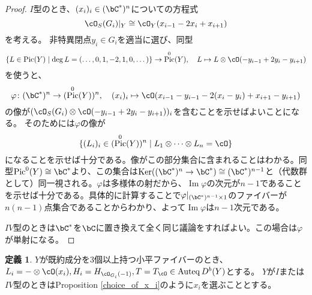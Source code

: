\documentclass[uplatex, a4paper, dvipdfmx]{jsarticle}
\theoremstyle{definition}
\newtheorem{definition}[theorem]{定義}
\DeclareMathOperator{\Auteq}{\mathrm{Auteq}}
\DeclareMathOperator{\Pic}{\mathrm{Pic}}
\DeclareMathOperator{\Ker}{\mathrm{Ker}}
\DeclareMathOperator{\Image}{\mathrm{Im}}
\begin{document}
\begin{proof}
    $I$型のとき、$(x_i)_i \in (\bC^*)^n$についての方程式
    \begin{equation}
        \cO_S(G_i)\vert_Y \cong \cO_Y(x_{i-1} - 2x_i + x_{i+1})
    \end{equation}
    を考える。
    非特異閉点$y_i \in G_i$を適当に選び、同型
    \begin{equation}
        \{L \in \Pic(Y) \mid \deg L = (\dots, 0, 1, -2, 1, 0, \dots)\} \to \Pic^0(Y), \quad L \mapsto L \otimes \cO(-y_{i-1}+2y_i-y_{i+1})
    \end{equation}
    を使うと、
    \begin{equation}
        \varphi \colon (\bC^*)^n \to (\Pic^0(Y))^n, \quad (x_i)_i \mapsto \cO(x_{i-1}-y_{i-1} - 2(x_i-y_i)+x_{i+1}-y_{i+1})
    \end{equation}
    の像が$(\cO_S(G_i) \otimes \cO(-y_{i-1}+2y_i-y_{i+1}))_i$を含むことを示せばよいことになる。
    そのためには$\varphi$の像が
    \begin{equation}
        \{(L_i)_i \in (\Pic^0(Y))^n \mid L_1 \otimes \cdots \otimes L_n = \cO\}
    \end{equation}
    になることを示せば十分である。像がこの部分集合に含まれることはわかる。同型$\Pic^0(Y) \cong \bC^*$より、この集合は$\Ker((\bC^*)^n \to \bC^*) \cong (\bC^*)^{n-1}$と（代数群として）同一視される。$\varphi$は多様体の射だから、$\Image \varphi$の次元が$n-1$であることを示せば十分である。具体的に計算することで$\varphi\vert_{(\bC^*)^{n-1} \times 1 }$のファイバーが$n(n-1)$点集合であることからわかり、よって$\Image \varphi$は$n-1$次元である。

    $IV$型のときは$\bC^*$を$\bC$に置き換えて全く同じ議論をすればよい。この場合は$\varphi$が単射になる。
\end{proof}
\begin{definition}\label{conjugate_action}
    $Y$が既約成分を3個以上持つ小平ファイバーのとき、$L_i = - \otimes \cO(x_i), H_i = H_{\cO_{G_i}(-1)}, T = T_\cO \in \Auteq D^b(Y)$とする。
    $Y$が$I$または$IV$型のときはProposition \ref{choice_of_x_i}のように$x_i$を選ぶこととする。
\end{definition}
\end{document}

